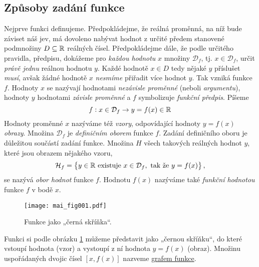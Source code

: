       \subsection{Způsoby zadání funkce}\label{MAI:section_000}
        Nejprve funkci definujeme. Předpokládejme, že reálná proměnná, na níž bude záviset náš jev, 
        má dovoleno nabývat hodnot z určité předem stanovené podmnožiny \(D\subseteq\mathbb{R}\) 
        reálných čísel. Předpokládejme dále, že podle určitého pravidla, předpisu, dokážeme pro 
        \emph{každou hodnotu} \(x\) množiny \(\mathcal{D}_f\), tj. \(x \in \mathcal{D}_f\), určit 
        \emph{právě jednu} reálnou hodnotu \(y\). Každé hodnotě \(x \in D\) tedy nějaké \(y\) 
        příslušet \emph{musí},  avšak žádné hodnotě \(x\) \emph{nesmíme} přiřadit více hodnot 
        \(y\). Tak vzniká funkce \(f\). Hodnoty \(x\) se nazývají hodnotami \emph{nezávisle 
        proměnné} (neboli \emph{argumentu}), hodnoty \(y\) hodnotami \emph{závisle proměnné} a 
        \(f\) symbolizuje \emph{funkční předpis}. Píšeme
        \begin{equation}\label{mai:eq000}
            f: x \in \mathcal{D}_f \rightarrow y=f(x)\in\mathbb{R}
        \end{equation}
      Hodnoty proměnné \(x\) nazýváme též \emph{vzory}, odpovídající hodnoty \(y = f(x)\) 
      \emph{obrazy}. Množina  \(\mathcal{D}_f\) je \emph{definičním oborem} funkce \(f\). Zadání 
      definičního oboru je důležitou součástí zadání funkce. Množina \(H\) všech takových reálných 
      hodnot \(y\), které jsou obrazem nějakého vzoru, 
      \begin{equation}\label{mai:eq001}
          \mathcal{H}_f = 
              \left\lbrace 
                y\in\mathbb{R}\text{ existuje } x\in \mathcal{D}_f, \text{ tak že } y = f(x)  
              \right\rbrace, 
      \end{equation}
      se nazývá \emph{obor hodnot} funkce \(f\). Hodnotu \(f(x)\) nazýváme také \emph{funkční 
      hodnotou} funkce \(f\) v bodě \(x\). 

      \begin{figure}[ht!] %
        \centering
%        
        \texttt{[image: mai\_fig001.pdf]}
        \caption{Funkce jako „černá skříňka“. \cite[s.~54]{Musilova2009MA1}}
        \label{mai_fig001}
      \end{figure}
      
      Funkci si podle obrázku \ref{mai_fig001} můžeme představit jako „černou skříňku“, do které 
      vstoupí hodnota (vzor) a vystoupí z ní hodnota \(y = f(x)\) (obraz). Množinu uspořádaných 
      dvojic čísel \([x, f(x)]\) nazveme \hyperref[MAI:section_001]{grafem funkce}.
      
